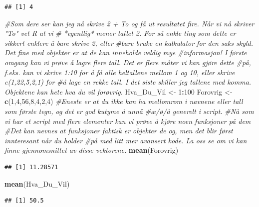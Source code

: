 \documentclass[
]{article}
\newenvironment{Shaded}{\begin{snugshade}}{\end{snugshade}}
\newcommand{\CommentTok}[1]{\textcolor[rgb]{0.56,0.35,0.01}{\textit{#1}}}
\newcommand{\DecValTok}[1]{\textcolor[rgb]{0.00,0.00,0.81}{#1}}
\newcommand{\KeywordTok}[1]{\textcolor[rgb]{0.13,0.29,0.53}{\textbf{#1}}}
\newcommand{\NormalTok}[1]{#1}
\newcommand{\OperatorTok}[1]{\textcolor[rgb]{0.81,0.36,0.00}{\textbf{#1}}}
\newcommand{\StringTok}[1]{\textcolor[rgb]{0.31,0.60,0.02}{#1}}
\begin{document}
\begin{verbatim}
## [1] 4
\end{verbatim}

\begin{Shaded}
\begin{Highlighting}[]
\CommentTok{#Som dere ser kan jeg nå skrive 2 + To og få ut resultatet fire. Når vi nå skriver "To" vet R at vi}
\CommentTok{# *egentlig* mener tallet 2. For så enkle ting som dette er sikkert enklere å bare skrive 2, eller}
\CommentTok{#bare bruke en kalkulator for den saks skyld. Det fine med objekter er at de kan inneholde veldig mye}
\CommentTok{#informasjon! I første omgang kan vi prøve å lagre flere tall. Det er flere måter vi kan gjøre dette}
\CommentTok{#på, f.eks. kan vi skrive 1:10 for å få alle heltallene mellom 1 og 10, eller skrive c(1,22,5,2,1) for}
\CommentTok{#å lage en rekke tall. I det siste skiller jeg tallene med komma. Objektene kan hete hva du vil forøvrig. }
\NormalTok{Hva_Du_Vil <-}\StringTok{ }\DecValTok{1}\OperatorTok{:}\DecValTok{100}
\NormalTok{Forovrig <-}\StringTok{ }\KeywordTok{c}\NormalTok{(}\DecValTok{1}\NormalTok{,}\DecValTok{4}\NormalTok{,}\DecValTok{56}\NormalTok{,}\DecValTok{8}\NormalTok{,}\DecValTok{4}\NormalTok{,}\DecValTok{2}\NormalTok{,}\DecValTok{4}\NormalTok{)}
\CommentTok{#Eneste er at du ikke kan ha mellomrom i navnene eller tall som første tegn, og det er god kutyme å unnå}
\CommentTok{#æ/ø/å generelt i script.}
\CommentTok{#Nå som vi har et script med flere elementer kan vi prøve å kjøre noen funksjoner på dem}
\CommentTok{#Det kan nevnes at funksjoner faktisk er objekter de og, men det blir først innteresant når du holder}
\CommentTok{#på med litt mer avansert kode. La oss se om vi kan finne gjennomsnittet av disse vektorene. }
\KeywordTok{mean}\NormalTok{(Forovrig)}
\end{Highlighting}
\end{Shaded}

\begin{verbatim}
## [1] 11.28571
\end{verbatim}

\begin{Shaded}
\begin{Highlighting}[]
\KeywordTok{mean}\NormalTok{(Hva_Du_Vil)}
\end{Highlighting}
\end{Shaded}

\begin{verbatim}
## [1] 50.5
\end{verbatim}
\end{document}
